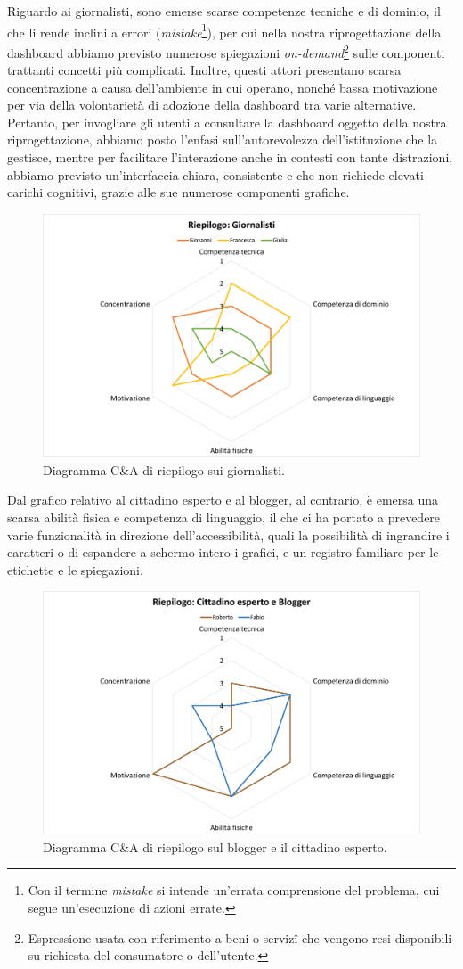 \noindent
Riguardo ai giornalisti, sono emerse scarse competenze tecniche e di dominio, il che li rende inclini a errori (\textit{mistake}\footnote{Con il termine \textit{mistake} si intende un'errata comprensione del problema, cui segue un'esecuzione di azioni errate.}), per cui nella nostra riprogettazione della dashboard abbiamo previsto numerose spiegazioni \textit{on-demand}\footnote{Espressione usata con riferimento a beni o servizî che vengono resi disponibili su richiesta del consumatore o dell'utente.} sulle componenti trattanti concetti più complicati.
Inoltre, questi attori presentano scarsa concentrazione a causa dell'ambiente in cui operano, nonché bassa motivazione per via della volontarietà di adozione della dashboard tra varie alternative.
Pertanto, per invogliare gli utenti a consultare la dashboard oggetto della nostra riprogettazione, abbiamo posto l'enfasi sull'autorevolezza dell'istituzione che la gestisce, mentre per facilitare l'interazione anche in contesti con tante distrazioni, abbiamo previsto un'interfaccia chiara, consistente e che non richiede elevati carichi cognitivi, grazie alle sue numerose componenti grafiche.
\begin{figure}[H]
    \centering
    \includegraphics[width=0.5\columnwidth]{assets/images/proposta-design/caos/riepilogo-giornalisti}
    \caption{Diagramma C\&A di riepilogo sui giornalisti.}
\end{figure}

\noindent
Dal grafico relativo al cittadino esperto e al blogger, al contrario, è emersa una scarsa abilità fisica e competenza di linguaggio, il che ci ha portato a prevedere varie funzionalità in direzione dell'accessibilità, quali la possibilità di ingrandire i caratteri o di espandere a schermo intero i grafici, e un registro familiare per le etichette e le spiegazioni.
\begin{figure}[H]
    \centering
    \includegraphics[width=0.5\columnwidth]{assets/images/proposta-design/caos/riepilogo-cittadini-altro}
    \caption{Diagramma C\&A di riepilogo sul blogger e il cittadino esperto.}
\end{figure}

